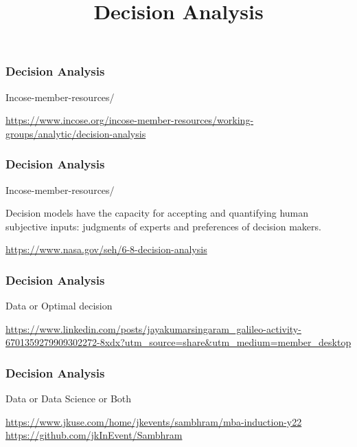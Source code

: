 


\title[Systems Engineering]{Decision Analysis} 





\newpage
\begin{frame}
\frametitle{ Decision Analysis }
\begin{block}{Incose-member-resources/}

 \url{https://www.incose.org/incose-member-resources/working-groups/analytic/decision-analysis}

\end{block}
\end{frame}

\newpage
\begin{frame}
\frametitle{ Decision Analysis }
\begin{block}{Incose-member-resources/}


 Decision models have the capacity for accepting and quantifying human subjective inputs: judgments of experts and preferences of decision makers.

 \vspace{1cm}
 
 \url{https://www.nasa.gov/seh/6-8-decision-analysis}

\end{block}
\end{frame}


\newpage
\begin{frame}
\frametitle{ Decision Analysis }
\begin{block}{Data or Optimal decision }

\url{https://www.linkedin.com/posts/jayakumarsingaram_galileo-activity-6701359279909302272-8xdx?utm_source=share&utm_medium=member_desktop}

\end{block}
\end{frame}




\newpage
\begin{frame}
\frametitle{ Decision Analysis }
\begin{block}{Data or Data Science or Both}

\url{https://www.jkuse.com/home/jkevents/sambhram/mba-induction-y22}
\url{https://github.com/jkInEvent/Sambhram}

\end{block}
\end{frame}
